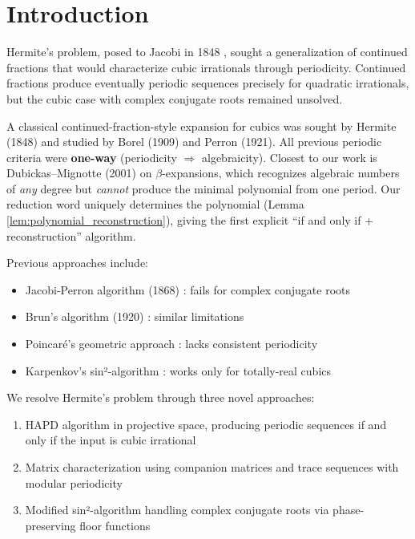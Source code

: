 \section{Introduction}\label{sec:intro}

Hermite's problem, posed to Jacobi in 1848 \cite{Hermite1848}, sought a generalization of continued fractions that would characterize cubic irrationals through periodicity. Continued fractions produce eventually periodic sequences precisely for quadratic irrationals, but the cubic case with complex conjugate roots remained unsolved.

A classical continued-fraction-style expansion for cubics was sought by Hermite (1848) and studied by Borel (1909) and Perron (1921). All previous periodic criteria were \textbf{one-way} (periodicity $\Rightarrow$ algebraicity). Closest to our work is Dubickas–Mignotte (2001) \cite{DubickasMignotte01} on $\beta$-expansions, which recognizes algebraic numbers of \textit{any} degree but \textit{cannot} produce the minimal polynomial from one period. Our reduction word uniquely determines the polynomial (Lemma \ref{lem:polynomial_reconstruction}), giving the first explicit ``if and only if + reconstruction'' algorithm.

Previous approaches include:
\begin{itemize}
\item Jacobi-Perron algorithm (1868) \cite{Jacobi1868}: fails for complex conjugate roots
\item Brun's algorithm (1920) \cite{Brentjes1981}: similar limitations
\item Poincaré's geometric approach \cite{KarpenkovBook}: lacks consistent periodicity
\item Karpenkov's sin²-algorithm \cite{Karpenkov2019}: works only for totally-real cubics
\end{itemize}

We resolve Hermite's problem through three novel approaches:
\begin{enumerate}
\item HAPD algorithm in projective space, producing periodic sequences if and only if the input is cubic irrational
\item Matrix characterization using companion matrices and trace sequences with modular periodicity
\item Modified sin²-algorithm handling complex conjugate roots via phase-preserving floor functions
\end{enumerate}

